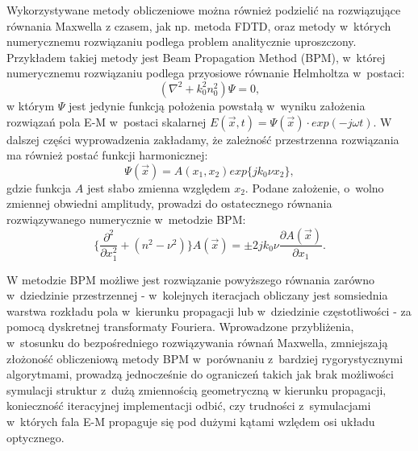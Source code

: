 Wykorzystywane metody obliczeniowe można również podzielić na rozwiązujące równania Maxwella z czasem, jak np. metoda FDTD, oraz metody w~których numerycznemu rozwiązaniu podlega problem analitycznie uproszczony. Przykładem takiej metody jest Beam Propagation Method (BPM), w~której numerycznemu rozwiązaniu podlega przyosiowe równanie Helmholtza w~postaci:
\begin{equation}
 ( \nabla ^2 + k_0^2 n_0^2) \Psi = 0,
\end{equation}
w którym $\Psi$ jest jedynie funkcją położenia powstałą w~wyniku założenia rozwiązań pola E-M w~postaci skalarnej $E(\vec{x},t)=\Psi(\vec{x})\cdot exp(-j\omega t)$. W dalszej części wyprowadzenia zakładamy, że zależność przestrzenna rozwiązania ma również postać funkcji harmonicznej:
\begin{equation}
\Psi(\vec{x})=A(x_1,x_2) exp\{jk_0\nu x_2\}, 
\end{equation}
gdzie funkcja $A$ jest słabo zmienna względem $x_2$. Podane założenie, o~wolno zmiennej obwiedni amplitudy, prowadzi do ostatecznego równania rozwiązywanego numerycznie w~metodzie BPM:
\begin{equation}
 \{  \frac{\partial^2 }{\partial x_1^2 } + (n^2 - \nu^2) \} A(\vec{x}) = \pm  2jk_0\nu \frac{\partial A (\vec{x})}{\partial x_1}.
\end{equation}

W metodzie BPM możliwe jest rozwiązanie powyższego równania zarówno w~dziedzinie przestrzennej - w~kolejnych iteracjach obliczany jest somsiednia warstwa rozkładu pola w~kierunku propagacji lub w~dziedzinie częstotliwości - za pomocą dyskretnej transformaty Fouriera. Wprowadzone przybliżenia, w~stosunku do bezpośredniego rozwiązywania równań Maxwella, zmniejszają złożoność obliczeniową metody BPM w~porównaniu z~bardziej rygorystycznymi algorytmami, prowadzą jednocześnie do ograniczeń takich jak brak możliwości symulacji struktur z~dużą zmiennością geometryczną w kierunku propagacji, konieczność iteracyjnej implementacji odbić, czy trudności z~symulacjami w~których fala E-M propaguje się pod dużymi kątami wzlędem osi układu optycznego.



 

